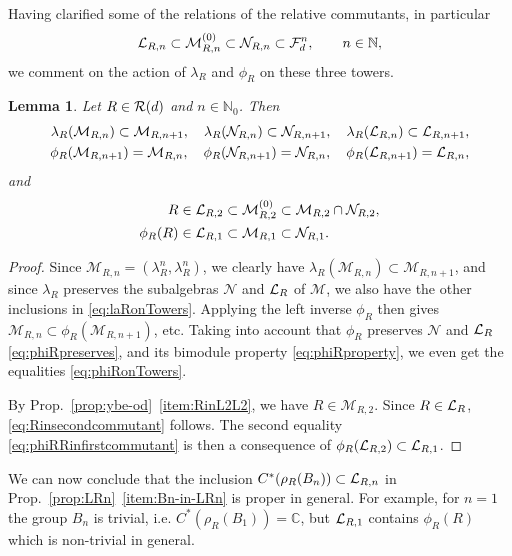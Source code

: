 \documentclass[12pt,a4paper]{amsart}
\numberwithin{equation}{section}
\newtheorem{lemma}[theorem]{Lemma}
\theoremstyle{remark}
\newcommand{\Cl}{\mathbb{C}}
\newcommand{\Nl}{\mathbb{N}}
\newcommand{\la}{\lambda}
\newcommand{\CM}[0]{\mathcal{M}} \newcommand{\CN}[0]{\mathcal{N}}
\begin{document}
Having clarified some of the relations of the relative commutants, in particular 
\begin{align}\label{eq:inclusions-of-relative-commutants}
    \CL_{R,n}\subset\CM_{R,n}^{(0)}\subset\CN_{R,n}\subset\CF_d^n,
    \qquad n\in\Nl,
\end{align}
we comment on the action of $\la_R$ and $\phi_R$ on these three towers.

\begin{lemma}
	Let $R\in\mathcal{R}(d)$ and $n\in\Nl_0$. Then 
	\begin{align}\label{eq:laRonTowers}
		\la_R(\CM_{R,n})\subset\CM_{R,n+1}
		,\quad
		\la_R(\CN_{R,n})\subset\CN_{R,n+1}
		,\quad
		\la_R(\CL_{R,n})\subset\CL_{R,n+1}
		,\\
		\phi_R(\CM_{R,n+1})=\CM_{R,n}
		,\quad
		\phi_R(\CN_{R,n+1})=\CN_{R,n}
		,\quad
		\phi_R(\CL_{R,n+1})=\CL_{R,n}
		,
		\label{eq:phiRonTowers}
	\end{align}
	and
	\begin{align}\label{eq:Rinsecondcommutant}
		R&\in\CL_{R,2}\subset\CM_{R,2}^{(0)}
		\subset\CM_{R,2}\cap\CN_{R,2},\\
		\phi_R(R)&\in\CL_{R,1}\subset\CM_{R,1}\subset\CN_{R,1}.
		\label{eq:phiRRinfirstcommutant}
	\end{align}
\end{lemma}
\begin{proof}
 	Since $\CM_{R,n}=(\la_R^n,\la_R^n)$, we clearly have $\la_R(\CM_{R,n})\subset\CM_{R,n+1}$, and since $\la_R$ preserves the subalgebras $\CN$ and $\mathcal{L}_R$ of $\CM$, we also have the other inclusions in \eqref{eq:laRonTowers}. Applying the left inverse $\phi_R$ then gives $\CM_{R,n}\subset\phi_R(\CM_{R,n+1})$, etc. Taking into account that $\phi_R$ preserves $\CN$ and $\mathcal{L}_R$ \eqref{eq:phiRpreserves}, and its bimodule property \eqref{eq:phiRproperty}, we even get the equalities \eqref{eq:phiRonTowers}.

	By Prop.~\ref{prop:ybe-od}~\ref{item:RinL2L2}, we have $R\in\CM_{R,2}$. Since $R\in\mathcal{L}_R$, \eqref{eq:Rinsecondcommutant} follows. The second equality \eqref{eq:phiRRinfirstcommutant} is then a consequence of $\phi_R(\mathcal{L}_{R,2})\subset\mathcal{L}_{R,1}$.
\end{proof}

We can now conclude that the inclusion $C^*(\rho_R(B_n))\subset\mathcal{L}_{R,n}$ in Prop.~\ref{prop:LRn}~\ref{item:Bn-in-LRn} is proper in general. For example, for $n=1$ the group $B_n$ is trivial, i.e. $C^*(\rho_R(B_1))=\Cl$, but $\mathcal{L}_{R,1}$ contains $\phi_R(R)$ which is non-trivial in general.
\end{document}
